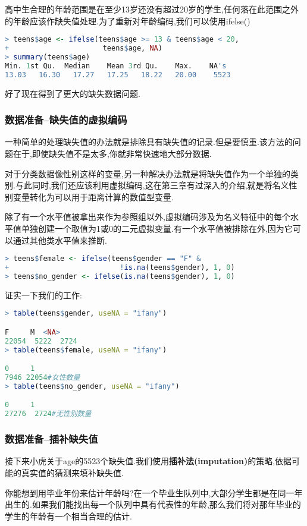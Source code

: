 \documentclass[11pt,a4paper,oneside]{book}
\begin{document}
高中生合理的年龄范围是在至少13岁还没有超过20岁的学生,任何落在此范围之外的年龄应该作缺失值处理.为了重新对年龄编码,我们可以使用ifelse()
\begin{lstlisting}[language=r]
> teens$age <- ifelse(teens$age >= 13 & teens$age < 20,
+                      teens$age, NA)
> summary(teens$age)
Min. 1st Qu.  Median    Mean 3rd Qu.    Max.    NA's 
13.03   16.30   17.27   17.25   18.22   20.00    5523 
\end{lstlisting}
好了现在得到了更大的缺失数据问题.

\subsubsection{数据准备--缺失值的虚拟编码}
一种简单的处理缺失值的办法就是排除具有缺失值的记录.但是要慎重.该方法的问题在于,即使缺失值不是太多,你就非常快速地大部分数据.

对于分类数据像性别这样的变量,另一种解决办法就是将缺失值作为一个单独的类别.与此同时,我们还应该利用虚拟编码,这在第三章有过深入的介绍,就是将名义性别变量转化为可以用于距离计算的数值型变量.

除了有一个水平值被拿出来作为参照组以外,虚拟编码涉及为名义特征中的每个水平值单独创建一个取值为1或0的二元虚拟变量.有一个水平值被排除在外,因为它可以通过其他类水平值来推断.
\begin{lstlisting}[language=r]
> teens$female <- ifelse(teens$gender == "F" &
+                          !is.na(teens$gender), 1, 0)
> teens$no_gender <- ifelse(is.na(teens$gender), 1, 0)
\end{lstlisting}
证实一下我们的工作:
\begin{lstlisting}[language=r]
> table(teens$gender, useNA = "ifany")

F     M  <NA> 
22054  5222  2724 
> table(teens$female, useNA = "ifany")

0     1 
7946 22054#女性数量
> table(teens$no_gender, useNA = "ifany")

0     1 
27276  2724#无性别数量 
\end{lstlisting}

\subsubsection{数据准备--插补缺失值}
接下来小虎关于age的5523个缺失值.我们使用\textbf{插补法(imputation)}的策略,依据可能的真实值的猜测来填补缺失值.

你能想到用毕业年份来估计年龄吗?在一个毕业生队列中,大部分学生都是在同一年出生的.如果我们能找出每一个队列中具有代表性的年龄,那么我们将对那年毕业的学生的年龄有一个相当合理的估计.
\end{document}
